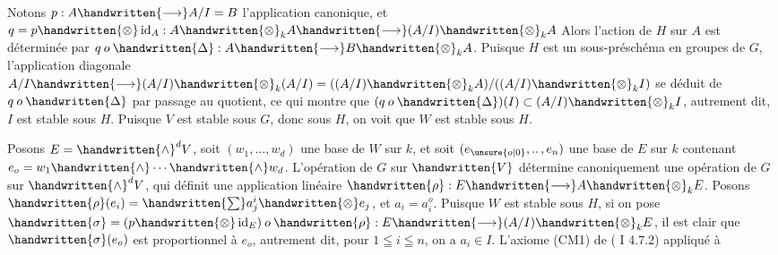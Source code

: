 Notons $p:A\handwritten{\longrightarrow}A/I=B$ l'application canonique, et $q=p\handwritten{\otimes}\operatorname{id}_A:A\handwritten{\otimes}_k A\handwritten{\longrightarrow}(A/I)\handwritten{\otimes}_k A$ Alors l'action de $H$ sur $A$ est déterminée par $q\mathbin{o}\handwritten{\Delta}:A\handwritten{\longrightarrow}B\handwritten{\otimes}_k A$. Puisque $H$ est un sous-préschéma en groupes de $G$, l'application diagonale $A/I\handwritten{\longrightarrow}(A/I)\handwritten{\otimes}_k(A/I)=((A/I)\handwritten{\otimes}_k A)/((A/I)\handwritten{\otimes}_k I)$ se déduit de $q\mathbin{o}\handwritten{\Delta}$ par passage au quotient, ce qui montre que $(q\mathbin{o}\handwritten{\Delta})(I)\subset(A/I)\handwritten{\otimes}_k I$, autrement dit, $I$ est stable sous $H$. Puisque $V$ est stable sous $G$, donc sous $H$, on voit que $W$ est stable sous $H$.

Posons $E=\handwritten{\wedge}^d V$, soit $(w_1,\ldots,w_d)$ une base de $W$ sur $k$, et soit $(e_{\unsure{o|0}},\mathinner{..},e_n)$ une base de $E$ sur $k$ contenant $e_o=w_1\handwritten{\wedge}\cdots\handwritten{\wedge}w_d$. L'opération de $G$ sur $\handwritten{V}$ détermine canoniquement une opération de $G$ sur $\handwritten{\wedge}^d V$, qui définit une application linéaire $\handwritten{\rho}:E\handwritten{\longrightarrow}A\handwritten{\otimes}_k E$. Posons $\handwritten{\rho}(e_i)=\handwritten{\sum}a_j^i\handwritten{\otimes}e_j$, et $a_i=a_i^o$. Puisque $W$ est stable sous $H$, si on pose $\handwritten{\sigma}=(p\handwritten{\otimes}\operatorname{id}_E)\mathbin{o}\handwritten{\rho}:E\handwritten{\longrightarrow}(A/I)\handwritten{\otimes}_k E$, il est clair que $\handwritten{\sigma}(e_o)$ est proportionnel à $e_o$, autrement dit, pour $1\leqq i\leqq n$, on a $a_i\in I$. L'axiome (CM1) de ( I 4.7.2) appliqué à
